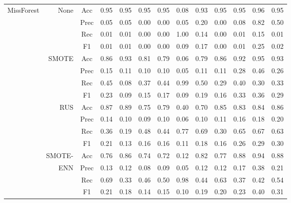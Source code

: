 \begin{table*}
\begin{narrow}{-1cm}{-1cm}
\begin{subtable}[t]{2.05\columnwidth}
\begin{tabular}{l|r|c|cccccccccc}
        MissForest & None & Acc & 0.95 & 0.95 & 0.95 & 0.95 & 0.08 & 0.93 & 0.95 & 0.95 & 0.96 & 0.95 \\
        ~ & ~ & Prec & 0.05 & 0.05 & 0.00 & 0.00 & 0.05 & 0.20 & 0.00 & 0.08 & 0.82 & 0.50 \\
        ~ & ~ & Rec & 0.01 & 0.01 & 0.00 & 0.00 & 1.00 & 0.14 & 0.00 & 0.01 & 0.15 & 0.01 \\
        ~ & ~ & F1 & 0.01 & 0.01 & 0.00 & 0.00 & 0.09 & 0.17 & 0.00 & 0.01 & 0.25 & 0.02 \\
        \cline{2-13}
        ~ & SMOTE & Acc & 0.86 & 0.93 & 0.81 & 0.79 & 0.06 & 0.79 & 0.86 & 0.92 & 0.95 & 0.93 \\
        ~ & ~ & Prec & 0.15 & 0.11 & 0.10 & 0.10 & 0.05 & 0.11 & 0.11 & 0.28 & 0.46 & 0.26 \\
        ~ & ~ & Rec & 0.45 & 0.08 & 0.37 & 0.44 & 0.99 & 0.50 & 0.29 & 0.40 & 0.30 & 0.33 \\
        ~ & ~ & F1 & 0.23 & 0.09 & 0.15 & 0.17 & 0.09 & 0.19 & 0.16 & 0.33 & 0.36 & 0.29 \\
        \cline{2-13}
        ~ & RUS & Acc & 0.87 & 0.89 & 0.75 & 0.79 & 0.40 & 0.70 & 0.85 & 0.83 & 0.84 & 0.86 \\
        ~ & ~ & Prec & 0.14 & 0.10 & 0.09 & 0.10 & 0.06 & 0.10 & 0.11 & 0.16 & 0.18 & 0.20 \\
        ~ & ~ & Rec & 0.36 & 0.19 & 0.48 & 0.44 & 0.77 & 0.69 & 0.30 & 0.65 & 0.67 & 0.63 \\
        ~ & ~ & F1 & 0.21 & 0.13 & 0.16 & 0.16 & 0.11 & 0.18 & 0.16 & 0.26 & 0.29 & 0.30 \\
        \cline{2-13}
        ~ & SMOTE- & Acc & 0.76 & 0.86 & 0.74 & 0.72 & 0.12 & 0.82 & 0.77 & 0.88 & 0.94 & 0.88 \\
        ~ & ENN & Prec & 0.13 & 0.12 & 0.08 & 0.09 & 0.05 & 0.12 & 0.12 & 0.17 & 0.38 & 0.21 \\
        ~ & ~ & Rec & 0.69 & 0.33 & 0.46 & 0.50 & 0.98 & 0.44 & 0.63 & 0.37 & 0.42 & 0.54 \\
        ~ & ~ & F1 & 0.21 & 0.18 & 0.14 & 0.15 & 0.10 & 0.19 & 0.20 & 0.23 & 0.40 & 0.31 \\
        \hline\hline
        

\end{tabular}
\end{subtable}
\end{narrow}
\end{table*}
